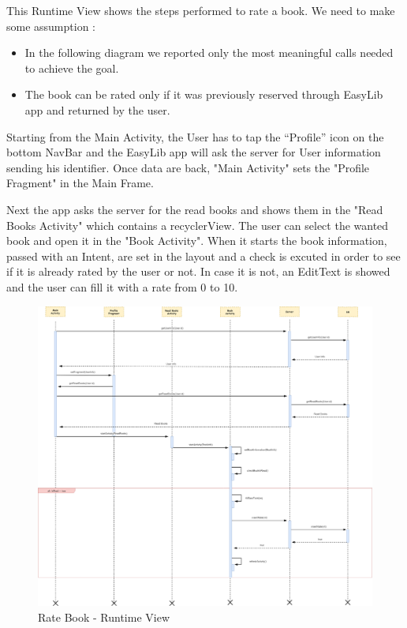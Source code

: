 \newpage
\vspace*{0cm}
This Runtime View shows the steps performed to rate a book.
We need to make some assumption :
\begin{itemize}
	\setlength{\leftskip}{0.5cm}
	\item In the following diagram we reported only the most meaningful calls needed to achieve the goal.
	\item The book can be rated only if it was previously reserved through EasyLib app and returned by the user.
\end{itemize}
Starting from the Main Activity, the User has to tap the “Profile” icon on the bottom NavBar and the EasyLib app will ask the server for User information sending his identifier. Once data are back, "Main Activity" sets the "Profile Fragment" in the Main Frame.\par
Next the app asks the server for the read books and shows them in the "Read Books Activity" which contains a recyclerView. The user can select the wanted book and open it in the "Book Activity". When it starts the book information, passed with an Intent, are set in the layout and a check is excuted in order to see if it is already rated by the user or not. In case it is not, an EditText is showed and the user can fill it with a rate from 0 to 10.
\newpage
\vspace*{0cm}
\begin{figure}[H]
	\centering
	\includegraphics[scale=0.22]{Images/Runtime/rate_book}
	\caption{Rate Book - Runtime View}
\end{figure}


